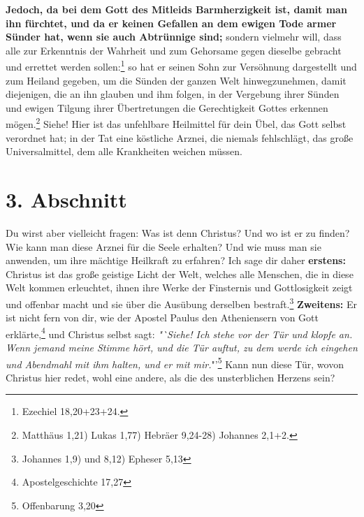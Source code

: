 \label{ref:02_02_kein_gefallen_am_tod}
\textbf{Jedoch, da bei dem Gott des Mitleids Barmherzigkeit ist, damit man ihn
fürchtet, und da er keinen Gefallen an dem ewigen Tode  armer
Sünder hat, wenn
sie auch Abtrünnige sind;} sondern vielmehr will, dass alle zur Erkenntnis der
Wahrheit und zum Gehorsame gegen dieselbe gebracht und errettet werden
sollen:\footnote{Ezechiel 18,20+23+24.}
 so hat er seinen Sohn zur
Versöhnung
dargestellt und zum Heiland gegeben, um die Sünden der ganzen Welt
hinwegzunehmen, damit diejenigen, die an ihn glauben und ihm folgen, in der
Vergebung ihrer Sünden und ewigen Tilgung ihrer Übertretungen die
Gerechtigkeit Gottes erkennen mögen.\footnote{Matthäus 1,21) Lukas 1,77) Hebräer
9,24-28) Johannes 2,1+2.}
Siehe! Hier ist das unfehlbare Heilmittel für dein
Übel, das Gott selbst verordnet hat; in der Tat eine köstliche Arznei, die
niemals fehlschlägt, das große Universalmittel, dem alle Krankheiten weichen
müssen.

\section{3. Abschnitt}  \label{kap2_ab3}

\label{ref:02_03_gott_in_jedem}
Du wirst aber vielleicht fragen: Was ist denn Christus? Und wo ist er zu finden?
Wie kann man diese Arznei für die Seele erhalten? Und wie muss man sie anwenden,
um ihre mächtige Heilkraft zu erfahren? Ich sage dir daher \textbf{erstens:}
Christus ist das große geistige Licht der Welt, welches alle Menschen, die in
diese Welt kommen erleuchtet, ihnen ihre Werke der Finsternis und Gottlosigkeit
zeigt und offenbar macht und sie über die Ausübung derselben
bestraft.\footnote{Johannes 1,9) und 8,12) Epheser 5,13}
\textbf{Zweitens:} Er ist nicht fern von dir, wie der
Apostel Paulus den Atheniensern von Gott erklärte,\footnote{Apostelgeschichte
17,27}
und Christus selbst sagt:
\textit{"`Siehe! Ich stehe vor der Tür und klopfe an.
Wenn jemand meine Stimme hört, und die Tür auftut, zu dem werde ich eingehen
und Abendmahl mit ihm halten, und er mit mir.}"'\footnote{Offenbarung 3,20}
Kann 
nun diese Tür, wovon Christus hier redet, wohl eine andere, als die des
unsterblichen Herzens sein?

